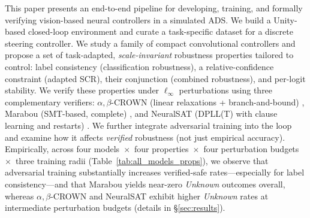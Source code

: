 This paper presents an end-to-end pipeline for developing, training, and formally verifying vision-based neural controllers in a simulated ADS. We build a Unity-based closed-loop environment and curate a task-specific dataset for a discrete steering controller. We study a family of compact convolutional controllers and propose a set of task-adapted, \emph{scale-invariant} robustness properties tailored to control: label consistency (classification robustness), a relative-confidence constraint (adapted SCR), their conjunction (combined robustness), and per-logit stability. We verify these properties under $\ell_\infty$ perturbations using three complementary verifiers: $\alpha,\beta$-CROWN (linear relaxations + branch-and-bound) \cite{zhang2018efficient, xu2021fast, wang2021beta, zhou2024scalable}, Marabou (SMT-based, complete) \cite{katz2019marabou}, and NeuralSAT (DPLL(T) with clause learning and restarts) \cite{duong2024dpllt}. We further integrate adversarial training into the loop and examine how it affects \emph{verified} robustness (not just empirical accuracy). Empirically, across four models~$\times$~four properties~$\times$~four perturbation budgets~$\times$~three training radii (Table~\ref{tab:all_models_props}), we observe that adversarial training substantially increases verified-safe rates—especially for label consistency—and that Marabou yields near-zero \emph{Unknown} outcomes overall, whereas $\alpha,\beta$-CROWN and NeuralSAT exhibit higher \emph{Unknown} rates at intermediate perturbation budgets (details in \S\ref{sec:results}).

